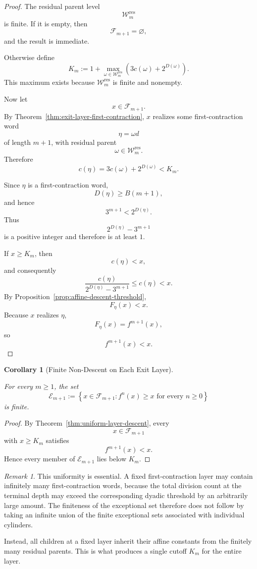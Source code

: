 \documentclass[12pt, oneside]{article}
\numberwithin{equation}{section}
\theoremstyle{definition}
\theoremstyle{plain}
\newtheorem{corollary}[theorem]{Corollary}
\theoremstyle{remark}
\newtheorem*{remark}{Remark}
\begin{document}
\begin{proof}
The residual parent level
\[
\mathcal W_m^{\mathrm{res}}
\]
is finite. If it is empty, then
\[
\mathcal F_{m+1}=\varnothing,
\]
and the result is immediate.

Otherwise define
\[
K_m
:=
1+
\max_{\omega\in\mathcal W_m^{\mathrm{res}}}
\left(
3c(\omega)+2^{D(\omega)}
\right).
\]
This maximum exists because
\(\mathcal W_m^{\mathrm{res}}\) is finite and nonempty.

Now let
\[
x\in\mathcal F_{m+1}.
\]
By Theorem~\ref{thm:exit-layer-first-contraction}, \(x\) realizes some
first-contraction word
\[
\eta=\omega d
\]
of length \(m+1\), with residual parent
\[
\omega\in\mathcal W_m^{\mathrm{res}}.
\]
Therefore
\[
c(\eta)
=
3c(\omega)+2^{D(\omega)}
<
K_m.
\]

Since \(\eta\) is a first-contraction word,
\[
D(\eta)\ge B(m+1),
\]
and hence
\[
3^{m+1}<2^{D(\eta)}.
\]
Thus
\[
2^{D(\eta)}-3^{m+1}
\]
is a positive integer and therefore is at least \(1\).

If \(x\ge K_m\), then
\[
c(\eta)<x,
\]
and consequently
\[
\frac{c(\eta)}
     {2^{D(\eta)}-3^{m+1}}
\le c(\eta)<x.
\]
By Proposition~\ref{prop:affine-descent-threshold},
\[
F_\eta(x)<x.
\]
Because \(x\) realizes \(\eta\),
\[
F_\eta(x)=f^{m+1}(x),
\]
so
\[
f^{m+1}(x)<x.
\]
\end{proof}

\begin{corollary}[Finite Non-Descent on Each Exit Layer]
\label{cor:finite-layer-nondescent}

For every \(m\ge1\), the set
\[
\mathcal E_{m+1}
:=
\left\{
x\in\mathcal F_{m+1}:
f^n(x)\ge x
\text{ for every }n\ge0
\right\}
\]
is finite.
\end{corollary}

\begin{proof}
By Theorem~\ref{thm:uniform-layer-descent}, every
\[
x\in\mathcal F_{m+1}
\]
with \(x\ge K_m\) satisfies
\[
f^{m+1}(x)<x.
\]
Hence every member of \(\mathcal E_{m+1}\) lies below \(K_m\).
\end{proof}

\begin{remark}
This uniformity is essential. A fixed first-contraction layer may contain
infinitely many first-contraction words, because the total division count
at the terminal depth may exceed the corresponding dyadic threshold by an
arbitrarily large amount. The finiteness of the exceptional set therefore
does not follow by taking an infinite union of the finite exceptional sets
associated with individual cylinders.

Instead, all children at a fixed layer inherit their affine constants from
the finitely many residual parents. This is what produces a single cutoff
\(K_m\) for the entire layer.
\end{remark}
\end{document}

